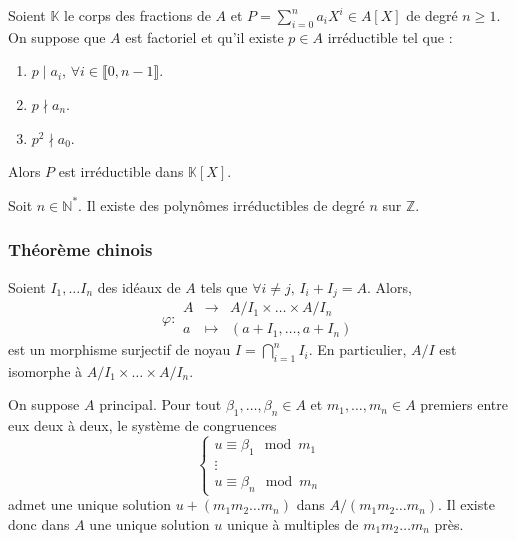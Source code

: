 
	\begin{theorem}
		Soient $\mathbb{K}$ le corps des fractions de $A$ et $P = \sum_{i=0}^n a_i X^i \in A[X]$ de degré $n \geq 1$. On suppose que $A$ est factoriel et qu'il existe $p \in A$ irréductible tel que :
		\begin{enumerate}[label=(\roman*)]
			\item $p \mid a_i$, $\forall i \in \llbracket 0, n-1 \rrbracket$.
			\item $p \nmid a_n$.
			\item $p^2 \nmid a_0$.
		\end{enumerate}
		Alors $P$ est irréductible dans $\mathbb{K}[X]$.
	\end{theorem}


	\begin{application}
		Soit $n \in \mathbb{N}^*$. Il existe des polynômes irréductibles de degré $n$ sur $\mathbb{Z}$.
	\end{application}

	\subsubsection{Théorème chinois}


	\begin{theorem}
		Soient $I_1, \dots I_n$ des idéaux de $A$ tels que $\forall i \neq j, \, I_i + I_j = A$. Alors,
		\[
			\varphi :
			\begin{array}{ccc}
				A &\rightarrow& A/I_1 \times \dots \times A/I_n \\
				a &\mapsto& (a + I_1, \dots, a + I_n)
			\end{array}
		\]
		est un morphisme surjectif de noyau $I = \bigcap_{i=1}^n I_i$. En particulier, $A/I$ est isomorphe à $A/I_1 \times \dots \times A/I_n$.
	\end{theorem}

	\begin{corollary}
		On suppose $A$ principal. Pour tout $\beta_1, \dots, \beta_n \in A$ et $m_1, \dots, m_n \in A$ premiers entre eux deux à deux, le système de congruences
		\[
			\begin{cases}
				u \equiv \beta_1 \mod m_1 \\
				\vdots \\
				u \equiv \beta_n \mod m_n
			\end{cases}
		\]
		admet une unique solution $u + (m_1 m_2 \dots m_n)$ dans $A / (m_1 m_2 \dots m_n)$. Il existe donc dans $A$ une unique solution $u$ unique à multiples de $m_1 m_2 \dots m_n$ près.
	\end{corollary}

